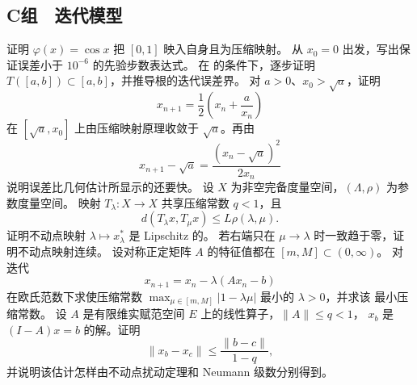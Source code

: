 \subsection*{C组　迭代模型}
\begin{enumerate}[label=\textbf{\thechapter.\arabic*.},resume]
 证明 \(\varphi(x)=\cos x\) 把 \([0,1]\) 映入自身且为压缩映射。
 从 \(x_0=0\) 出发，写出保证误差小于 \(10^{-6}\) 的先验步数表达式。
 在  的条件下，逐步证明
 \(T([a,b])\subset[a,b]\)，并推导根的迭代误差界。
 对 \(a>0\)、\(x_0>\sqrt a\)，证明
 \[
  x_{n+1}=\frac12\left(x_n+\frac{a}{x_n}\right)
 \]
 在 \([\sqrt a,x_0]\) 上由压缩映射原理收敛于 \(\sqrt a\)。再由
 \[
  x_{n+1}-\sqrt a
  =\frac{(x_n-\sqrt a)^2}{2x_n}
 \]
 说明误差比几何估计所显示的还要快。
 设 \(X\) 为非空完备度量空间，\((\Lambda,\rho)\) 为参数度量空间。
 映射 \(T_\lambda:X\to X\) 共享压缩常数 \(q<1\)，且
 \[
  d(T_\lambda x,T_\mu x)\le L\rho(\lambda,\mu).
 \]
 证明不动点映射 \(\lambda\mapsto x_\lambda^\ast\) 是 Lipschitz 的。
 若右端只在 \(\mu\to\lambda\) 时一致趋于零，证明不动点映射连续。
 设对称正定矩阵 \(A\) 的特征值都在 \([m,M]\subset(0,\infty)\)。
 对迭代
 \[
  x_{n+1}=x_n-\lambda(Ax_n-b)
 \]
 在欧氏范数下求使压缩常数
 \(\max_{\mu\in[m,M]}|1-\lambda\mu|\) 最小的 \(\lambda>0\)，并求该
 最小压缩常数。
 设 \(A\) 是有限维实赋范空间 \(E\) 上的线性算子，\(\|A\|\le q<1\)，
 \(x_b\) 是 \((I-A)x=b\) 的解。证明
 \[
  \|x_b-x_c\|\le\frac{\|b-c\|}{1-q},
 \]
 并说明该估计怎样由不动点扰动定理和 Neumann 级数分别得到。
\end{enumerate}

